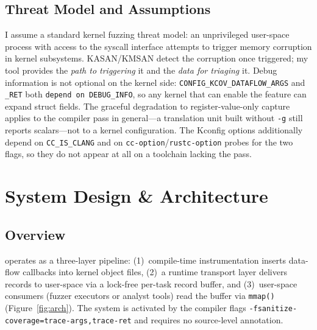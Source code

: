 \documentclass{article}
\begin{document}
\subsection{Threat Model and Assumptions}

I assume a standard kernel fuzzing threat model: an unprivileged user-space
process with access to the syscall interface attempts to trigger memory
corruption in kernel subsystems. KASAN/KMSAN detect the corruption once
triggered; my tool provides the \emph{path to triggering} it and the
\emph{data for triaging} it. Debug information is not optional on the kernel
side: \texttt{CONFIG\_KCOV\_DATAFLOW\_ARGS} and \texttt{\_RET} both
\texttt{depend on DEBUG\_INFO}, so any kernel that can enable the feature can
expand struct fields. The graceful degradation to register-value-only capture
applies to the compiler pass in general---a translation unit built without
\texttt{-g} still reports scalars---not to a kernel configuration. The Kconfig
options additionally depend on \texttt{CC\_IS\_CLANG} and on
\texttt{cc-option}/\texttt{rustc-option} probes for the two flags, so they do
not appear at all on a toolchain lacking the pass.


\section{System Design \& Architecture}\label{sec:design}

\subsection{Overview}

\toolname{} operates as a three-layer pipeline: (1)~compile-time
instrumentation inserts data-flow callbacks into kernel object files,
(2)~a runtime transport layer delivers records to user-space via a lock-free
per-task record buffer, and (3)~user-space consumers (fuzzer executors or analyst
tools) read the buffer via \texttt{mmap()} (Figure~\ref{fig:arch}). The system is activated by the
compiler flags \texttt{-fsanitize-coverage=trace-args,trace-ret} and
requires no source-level annotation.
\end{document}
